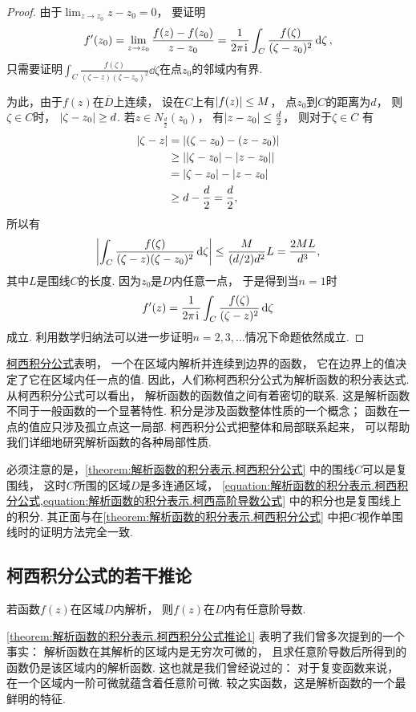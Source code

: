 \begin{theorem}
\begin{proof}
由于\(\lim_{z \to z_0} z-z_0 = 0\)，
要证明\[
	f'(z_0) = \lim_{z \to z_0} \frac{f(z)-f(z_0)}{z-z_0}
	= \frac{1}{2\pi\kern1pt\mathrm{i}\kern1pt} \int_C \frac{f(\zeta)}{(\zeta-z_0)^2} \dd{\zeta},
\]
只需要证明\(\int_C \frac{f(\zeta)}{(\zeta-z)(\zeta-z_0)^2} \dd{\zeta}\)在点\(z_0\)的邻域内有界.

为此，由于\(f(z)\)在\(\overline{D}\)上连续，
设在\(C\)上有\(\abs{f(z)} \leq M\)，
点\(z_0\)到\(C\)的距离为\(d\)，
则\(\zeta \in C\)时，
\(\abs{\zeta-z_0} \geq d\).
若\(z \in N_{\frac{d}{2}}(z_0)\)，
有\(\abs{z-z_0} \leq \frac{d}{2}\)，
则对于\(\zeta \in C\)
有\begin{align*}
	\abs{\zeta-z}
	&= \abs{(\zeta-z_0)-(z-z_0)} \\
	&\geq \abs{ \abs{\zeta-z_0} - \abs{z-z_0} } \\
	&= \abs{\zeta-z_0} - \abs{z-z_0} \\
	&\geq d - \frac{d}{2} = \frac{d}{2},
\end{align*}
所以有\[
	\abs{\int_C \frac{f(\zeta)}{(\zeta-z)(\zeta-z_0)^2} \dd{\zeta}}
	\leq \frac{M}{(d/2) d^2} L
	= \frac{2ML}{d^3},
\]
其中\(L\)是围线\(C\)的长度.
因为\(z_0\)是\(D\)内任意一点，
于是得到当\(n=1\)时\[
	f'(z) = \frac{1}{2\pi\kern1pt\mathrm{i}\kern1pt} \int_C{\frac{f(\zeta)}{(\zeta-z)^2}\dd{\zeta}}
\]成立.
利用数学归纳法可以进一步证明\(n=2,3,\dots\)情况下命题依然成立.
\end{proof}
\end{theorem}

\hyperref[equation:解析函数的积分表示.柯西积分公式]{柯西积分公式}表明，
一个在区域内解析并连续到边界的函数，
它在边界上的值决定了它在区域内任一点的值.
因此，人们称柯西积分公式为解析函数的积分表达式.
从柯西积分公式可以看出，
解析函数的函数值之间有着密切的联系.
这是解析函数不同于一般函数的一个显著特性.
积分是涉及函数整体性质的一个概念；
函数在一点的值应只涉及孤立点这一局部.
柯西积分公式把整体和局部联系起来，
可以帮助我们详细地研究解析函数的各种局部性质.

必须注意的是，\cref{theorem:解析函数的积分表示.柯西积分公式} 中的围线\(C\)可以是复围线，
这时\(C\)所围的区域\(D\)是多连通区域，
\cref{equation:解析函数的积分表示.柯西积分公式,equation:解析函数的积分表示.柯西高阶导数公式} 中的积分也是复围线上的积分.
其正面与在\cref{theorem:解析函数的积分表示.柯西积分公式} 中把\(C\)视作单围线时的证明方法完全一致.

\subsection{柯西积分公式的若干推论}
\begin{corollary}\label{theorem:解析函数的积分表示.柯西积分公式推论1}
若函数\(f(z)\)在区域\(D\)内解析，
则\(f(z)\)在\(D\)内有任意阶导数.
\end{corollary}
\cref{theorem:解析函数的积分表示.柯西积分公式推论1}
表明了我们曾多次提到的一个事实：
解析函数在其解析的区域内是无穷次可微的，
且求任意阶导数后所得到的函数仍是该区域内的解析函数.
这也就是我们曾经说过的：
对于复变函数来说，
在一个区域内一阶可微就蕴含着任意阶可微.
较之实函数，这是解析函数的一个最鲜明的特征.


